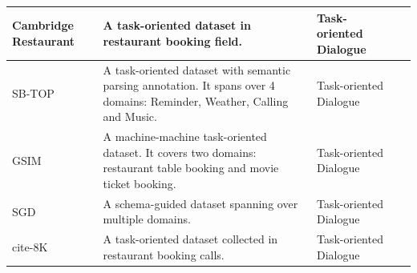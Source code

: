 \begin{longtable}{>{\centering\arraybackslash}y{2.5cm} y{5cm} >{\centering\arraybackslash}y{2cm} >{\centering\arraybackslash}y{2.5cm}}
Cambridge Restaurant	&	A task-oriented dataset in restaurant booking field.	&	Task-oriented Dialogue	&	~	 \\\hline
SB-TOP	&	A task-oriented dataset with semantic parsing annotation. It spans over 4 domains: Reminder, Weather, Calling and Music.	&	Task-oriented Dialogue	&	~	 \\\hline
GSIM	&	A machine-machine task-oriented dataset. It covers two domains: restaurant table booking and movie ticket booking.	&	Task-oriented Dialogue	&	~	 \\\hline
SGD	&	A schema-guided dataset spanning over multiple domains.	&	Task-oriented Dialogue	&	~	 \\\hline
cite-8K	&	A task-oriented dataset collected in restaurant booking calls.	&	Task-oriented Dialogue	&	~	 \\
\hline
\end{longtable}

